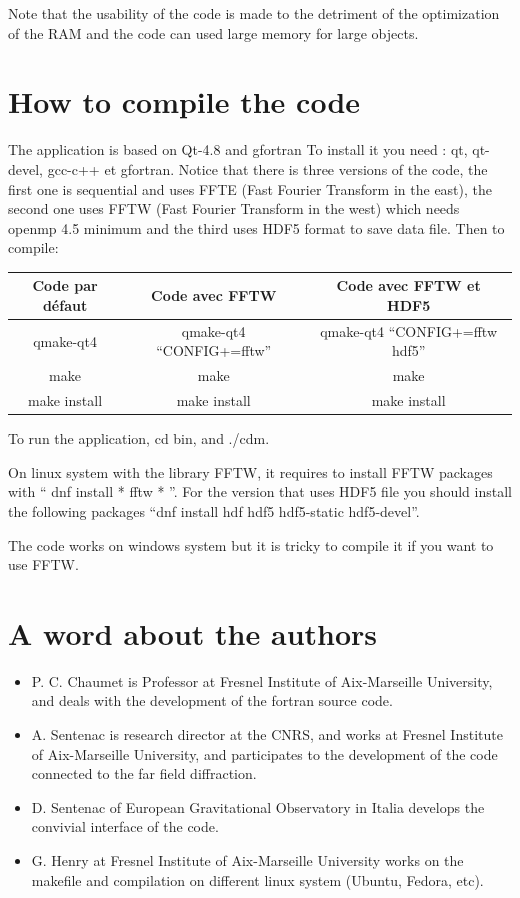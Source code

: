 Note that the usability of the code is made to the detriment of the
optimization of the RAM and the code can used large memory for large
objects.


\section{How to compile the code}
The application is based on Qt-4.8 and gfortran To install it you need
: qt, qt-devel, gcc-c++ et gfortran.  Notice that there is three
versions of the code, the first one is sequential and uses FFTE (Fast
Fourier Transform in the east), the second one uses FFTW (Fast Fourier
Transform in the west) which needs openmp 4.5 minimum and the third
uses HDF5 format to save data file. Then to compile:

\begin{tabular}{|c|c|c|}
  \hline
  Code par défaut & Code avec FFTW & Code avec FFTW et HDF5 \\
  \hline
  qmake-qt4 & qmake-qt4 ``CONFIG+=fftw'' & qmake-qt4 ``CONFIG+=fftw hdf5'' \\
  make & make & make \\
make install & make install & make install \\
  \hline
\end{tabular}

To run the application, cd bin, and ./cdm.


On linux system with the library FFTW, it requires to install FFTW
packages with `` dnf install * fftw * ''. For the version that uses
HDF5 file you should install the following packages ``dnf install hdf
hdf5 hdf5-static hdf5-devel''.

The code works on windows system but it is tricky to compile it if you
want to use FFTW.

\section{A word about the authors}

\begin{itemize}
\item P. C. Chaumet is Professor at Fresnel Institute of Aix-Marseille
  University, and deals with the development of the fortran source
  code.
\item A. Sentenac is research director at the CNRS, and works at
  Fresnel Institute of Aix-Marseille University, and participates to
  the development of the code connected to the far field diffraction.
\item D. Sentenac of European Gravitational Observatory in Italia
  develops the convivial interface of the code.
\item G. Henry at Fresnel Institute of Aix-Marseille University works
  on the makefile and compilation on different linux system (Ubuntu,
  Fedora, etc).
\end{itemize}

